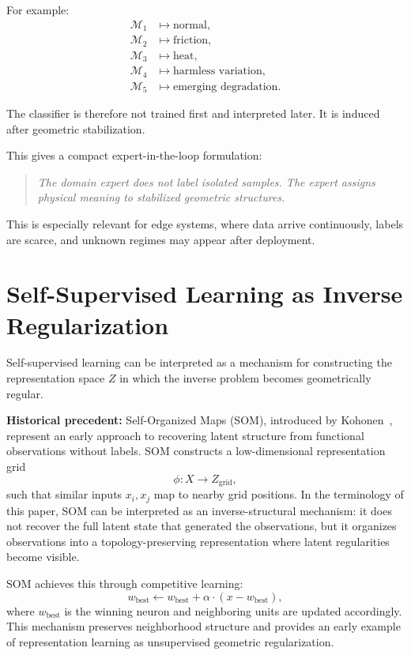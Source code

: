 \documentclass[11pt,a4paper]{article}
\begin{document}
For example:
\begin{align}
    \mathcal{M}_1 &\mapsto \text{normal}, \\
    \mathcal{M}_2 &\mapsto \text{friction}, \\
    \mathcal{M}_3 &\mapsto \text{heat}, \\
    \mathcal{M}_4 &\mapsto \text{harmless variation}, \\
    \mathcal{M}_5 &\mapsto \text{emerging degradation}.
\end{align}

The classifier is therefore not trained first and interpreted later. It is induced after geometric stabilization.

This gives a compact expert-in-the-loop formulation:

\begin{quote}
\emph{The domain expert does not label isolated samples. The expert assigns physical meaning to stabilized geometric structures.}
\end{quote}

This is especially relevant for edge systems, where data arrive continuously, labels are scarce, and unknown regimes may appear after deployment.

\section{Self-Supervised Learning as Inverse Regularization}

Self-supervised learning can be interpreted as a mechanism for constructing 
the representation space $Z$ in which the inverse problem becomes geometrically regular.

\textbf{Historical precedent:} Self-Organized Maps (SOM), introduced by Kohonen~\cite{kohonen1982som_original,kohonen1982som}, represent an early approach to recovering latent structure from functional observations without labels. SOM constructs a low-dimensional representation grid
\begin{equation}
\phi: X \longrightarrow Z_{\mathrm{grid}},
\end{equation}
such that similar inputs $x_i, x_j$ map to nearby grid positions. In the terminology of this paper, SOM can be interpreted as an inverse-structural mechanism: it does not recover the full latent state that generated the observations, but it organizes observations into a topology-preserving representation where latent regularities become visible.

SOM achieves this through competitive learning:
\begin{equation}
w_{\mathrm{best}} \leftarrow w_{\mathrm{best}} + \alpha \cdot (x - w_{\mathrm{best}}),
\end{equation}
where $w_{\mathrm{best}}$ is the winning neuron and neighboring units are updated accordingly. This mechanism preserves neighborhood structure and provides an early example of representation learning as unsupervised geometric regularization.
\end{document}
